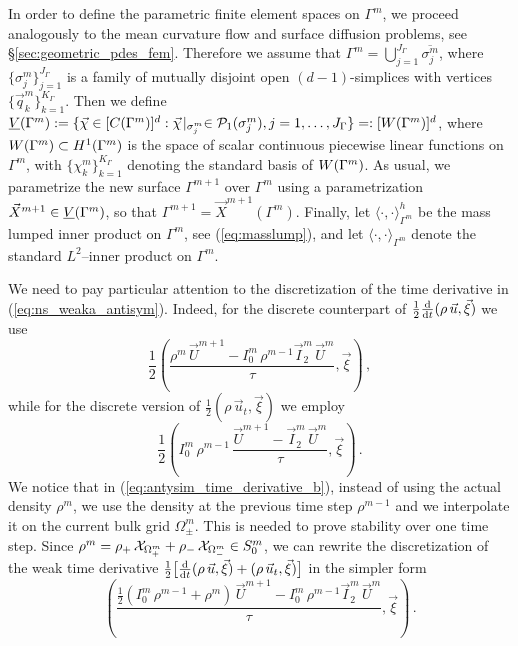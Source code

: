 In order to define the parametric finite element spaces on $\Gamma^m$, we
proceed analogously to the mean curvature flow and surface diffusion problems,
see \S\ref{sec:geometric_pdes_fem}. Therefore we assume that
$\Gamma^m=\bigcup_{j=1}^{J_\Gamma} \overline{\sigma^m_j}$, where
$\{\sigma^m_j\}_{j=1}^{J_\Gamma}$ is a family of mutually disjoint open
$(d-1)$-simplices with vertices $\{\vec q^m_k\}_{k=1}^{K_\Gamma}$. Then
we define $\underline{V}(\Gamma^m) := \{\vec\chi \in [C(\Gamma^m)]^d:\vec\chi\!\mid_{\sigma^m_j}
\in \mathcal{P}_1(\sigma^m_j), j=1,\ldots, J_\Gamma\} =: [W(\Gamma^m)]^d$, where $W(\Gamma^m)
\subset H^1(\Gamma^m)$ is the space of scalar continuous piecewise linear
functions on $\Gamma^m$, with $\{\chi^m_k\}_{k=1}^{K_\Gamma}$ denoting the
standard basis of $W(\Gamma^m)$. As usual, we parametrize the new surface
$\Gamma^{m+1}$ over $\Gamma^m$ using a parametrization $\vec X^{m+1} \in \underline{V}(\Gamma^m)$,
so that $\Gamma^{m+1} = \vec X^{m+1}(\Gamma^m)$. Finally, let
$\langle\cdot,\cdot\rangle_{\Gamma^m}^h$ be the mass lumped inner product on
$\Gamma^m$, see (\ref{eq:masslump}), and let
$\langle\cdot,\cdot\rangle_{\Gamma^m}$ denote the standard $L^2$--inner product
on $\Gamma^m$.

We need to pay particular attention to the discretization of the time
derivative in (\ref{eq:ns_weaka_antisym}). Indeed, for the discrete counterpart
of $\tfrac{1}{2} \frac{\rm d}{{\rm d}t} (\rho\,\vec u, \vec \xi)$ we use
\begin{equation}\label{eq:antysim_time_derivative_a}
\frac{1}{2}\left(\frac{\rho^m\,\vec U^{m+1} - I^m_0\,\rho^{m-1}
\vec I^m_2\,\vec U^m}{\tau}, \vec \xi \right)\,,
\end{equation}
while for the discrete version of $\tfrac{1}{2}(\rho\,\vec u_t, \vec \xi)$
we employ
\begin{equation}\label{eq:antysim_time_derivative_b}
\frac{1}{2}\left( I^m_0\,\rho^{m-1}\, \frac{\vec U^{m+1} - \vec I^m_2\,
\vec U^m}{\tau}, \vec \xi \right)\,.
\end{equation}
We notice that in (\ref{eq:antysim_time_derivative_b}), instead of using the
actual density $\rho^m$, we use the density at the previous time step
$\rho^{m-1}$ and we interpolate it on the current bulk grid $\Omega_\pm^m$. This
is needed to prove stability over one time step. Since
$\rho^m = \rho_+\,\mathrm{\mathcal{X}}_{\Omega^m_+} + \rho_-\,\mathrm{\mathcal{X}}_{\Omega^m_-}\in
S^m_0$, we can rewrite the discretization of the weak time derivative
$\tfrac{1}{2}\big[ \frac{\rm d}{{\rm d}t} (\rho\,\vec u, \vec \xi)+(\rho\,\vec u_t, \vec\xi)\big]$
in the simpler form
\begin{equation}
\left(\frac{\tfrac{1}{2}(I^m_0\,\rho^{m-1}+\rho^m)\,\vec U^{m+1} -
I^m_0\,\rho^{m-1} \vec I^m_2\,\vec U^m}{\tau}, \vec \xi \right)\,.
\end{equation}

